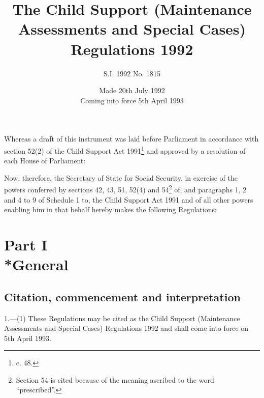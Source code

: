 \documentclass[a4paper]{article}
\title{The Child Support (Maintenance Assessments and Special Cases) Regulations 1992}
\author{S.I. 1992 No. 1815}
\date{Made 20th July 1992\\Coming into force 5th April 1993}
\newcommand{\parthead}{}
\begin{document}
\maketitle

\noindent
 Whereas a draft of this instrument was laid before Parliament in accordance with section 52(2) of the Child Support Act 1991\footnote{ c. 48.} and approved by a resolution of each House of Parliament:

Now, therefore, the Secretary of State for Social Security, in exercise of the powers conferred by sections 42, 43, 51, 52(4) and 54\footnote{\frenchspacing Section 54 is cited because of the meaning ascribed to the word “prescribed”.} of, and paragraphs 1, 2 and 4 to 9 of Schedule 1 to, the Child Support Act 1991 and of all other powers enabling him in that behalf hereby makes the following Regulations: 

{\sloppy

\tableofcontents

}

\setcounter{secnumdepth}{-2}

\section[Part I --- General]{Part I\\*General}

\renewcommand\parthead{--- Part I}

\subsection[1. Citation, commencement and interpretation]{Citation, commencement and interpretation}

1.—(1) These Regulations may be cited as the Child Support (Maintenance Assessments and Special Cases) Regulations 1992 and shall come into force on 5th April 1993.
\end{document}
